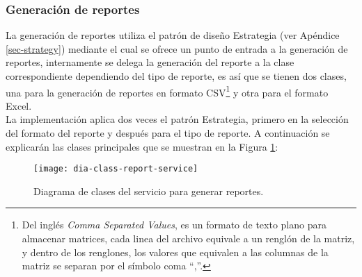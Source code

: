\subsubsection{Generación de reportes}
La generación de reportes utiliza el patrón de diseño Estrategia (ver Apéndice \ref{sec-strategy}) mediante el cual se ofrece un punto de entrada a la generación de reportes, internamente se delega la generación del reporte a la clase correspondiente dependiendo del tipo de reporte, es así que se tienen dos clases, una para la generación de reportes en formato CSV\footnote{Del inglés \textit{Comma Separated Values}, es un formato de texto plano para almacenar matrices, cada linea del archivo equivale a un renglón de la matriz, y dentro de los renglones, los valores que equivalen a las columnas de la matriz se separan por el símbolo coma ``,''.} y otra para el formato Excel\textsuperscript{\textcopyright}.\\
La implementación aplica dos veces el patrón Estrategia, primero en la selección del formato del reporte y después para el tipo de reporte. A continuación se explicarán las clases principales que se muestran en la Figura \ref{fig:dia-class-report-service}:

\begin{figure}[h]
	\centering
	\texttt{[image: dia-class-report-service]}
	\caption{Diagrama de clases del servicio para generar reportes.}
	\label{fig:dia-class-report-service}
\end{figure}

